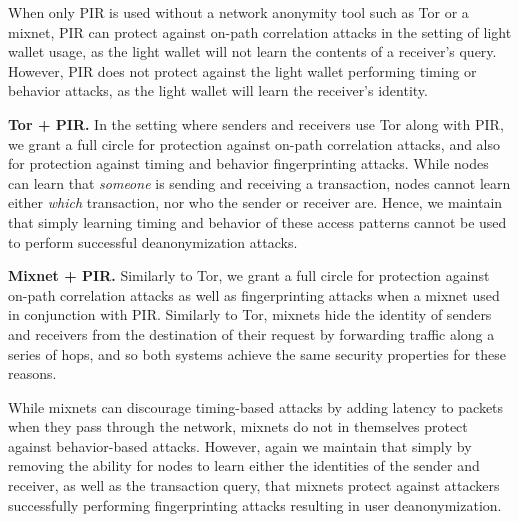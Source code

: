 \documentclass{article}
\begin{document}
When only PIR is used without a network anonymity tool such as Tor or a mixnet,
PIR can protect against on-path correlation attacks in the setting of light
wallet usage, as the light wallet will not learn the contents of a receiver's
query. However, PIR does not protect against the light wallet performing timing
or behavior attacks, as the light wallet will learn the receiver's identity.

\textbf{Tor + PIR.}
In the setting where senders and receivers use Tor along with PIR, we grant a
full circle for protection against on-path correlation
attacks, and also for protection against timing and behavior fingerprinting
attacks. While nodes can learn that \emph{someone} is sending and receiving a
transaction, nodes cannot learn either \emph{which} transaction, nor who the
sender or receiver are. Hence, we maintain that simply learning timing and
behavior of these access patterns cannot be used to perform successful
deanonymization attacks.

\textbf{Mixnet + PIR.}
Similarly to Tor, we grant a full circle for protection against on-path
correlation attacks as well as fingerprinting attacks when a mixnet used in
conjunction with PIR. Similarly to Tor, mixnets hide the identity of senders
and receivers from the destination of their request by forwarding traffic along
a series of hops, and so both systems achieve the same security properties for
these reasons.

While mixnets can discourage timing-based attacks by adding latency to
packets when they pass through the network, mixnets do not in themselves
protect against behavior-based attacks. However, again we maintain that simply
by removing the ability for nodes to learn either the identities of the sender
and receiver, as well as the transaction query, that mixnets protect against
attackers successfully performing fingerprinting attacks resulting in user
deanonymization.



\end{document}
